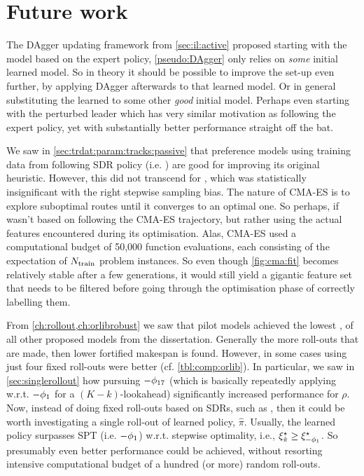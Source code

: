 \section{Future work}

The DAgger updating framework from \cref{sec:il:active} proposed starting with 
the model based on the expert policy, \cref{pseudo:DAgger} only relies on 
\emph{some} initial learned model. So in theory it should be possible to 
improve the  set-up even further, by applying DAgger 
afterwards to that learned model. Or in general substituting the learned 
 to some other \emph{good} initial model.
Perhaps even starting with the perturbed leader which has very similar 
motivation as following the expert policy, yet with substantially better 
performance straight off the bat. 

We saw in \cref{sec:trdat:param:tracks:passive} that preference models using 
training data from following SDR policy (i.e. \PhiSet{\SDR}) are good for 
improving its original heuristic. However, this did not transcend for 
\PhiSet{\CMAES}, which was statistically insignificant with the right stepwise 
sampling bias.
The nature of CMA-ES is to explore suboptimal routes until it converges to an 
optimal one. So perhaps, if \PhiSet{\CMAES} wasn't based on following the 
CMA-ES trajectory, but rather using the actual features encountered during its 
optimisation. 
Alas, CMA-ES used a computational budget of 50,000 function evaluations, each 
consisting of the expectation of $N_{\text{train}}$ problem instances. 
So even though \cref{fig:cma:fit} becomes relatively stable after a few 
generations, it would still yield a gigantic feature set that needs to be 
filtered before going through the optimisation phase of correctly labelling 
them.

From \cref{ch:rollout,ch:orlibrobust} we saw that pilot models achieved the 
lowest \namerho, of all other proposed models from the dissertation. 
Generally the more roll-outs that are made, then lower fortified makespan is 
found. However, in some cases using just four fixed roll-outs were better (cf. 
\cref{tbl:comp:orlib}). 
In particular, we saw in \cref{sec:singlerollout} how pursuing $-\phi_{17}$ 
(which is basically repeatedly applying w.r.t. $-\phi_1$ for a 
$(K-k)$-lookahead) significantly increased performance for $\rho$.
Now, instead of doing fixed roll-outs based on SDRs, such as \phiSDRRelated, 
then it could be worth investigating a single roll-out of learned policy, 
$\hat{\pi}$. 
Usually, the learned policy surpasses SPT (i.e. $-\phi_1$) w.r.t. stepwise 
optimality, i.e., $\xi^{\star}_{\hat{\pi}}\geq\xi^{\star}_{-\phi_1}$. 
So presumably even better performance could be achieved, without resorting 
intensive computational budget of a hundred (or more) random roll-outs.

